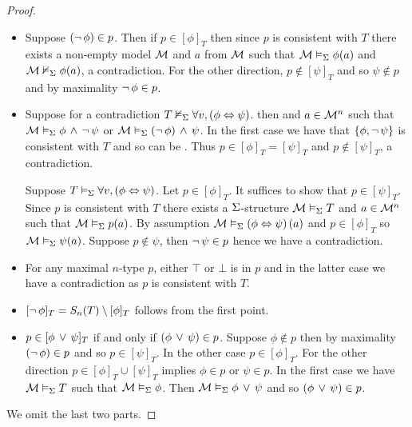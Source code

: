 \begin{proof}~
    \begin{itemize}
        \item Suppose $(\neg\, \phi) \in p$.
            Then if $p \in [\phi]_T$ then since $p$ is consistent with $T$
            there exists a non-empty model $\mathcal{M}$ and $a$ from 
            $\mathcal{M}$ such that
            $\mathcal{M} \vDash_{\Sigma} \phi(a)$ and $\mathcal{M} \nvDash_{\Sigma} \phi(a)$, 
            a contradiction.
            For the other direction, 
            $p \notin [\psi]_T$ and so $ \psi \notin p$ and
            by maximality $\neg\, \phi \in p$.
        \item \begin{forward}
            Suppose for a contradiction
            $T \nvDash_{\Sigma} \forall v, \left(\phi \Leftrightarrow \psi\right)$.
            then  and $a \in {\mathcal{M}}^n$ such that 
            $\mathcal{M} \vDash_{\Sigma} \phi \, \land \, \neg\, \psi$ or 
            $\mathcal{M} \vDash_{\Sigma} (\neg\, \phi) \, \land \, \psi$.
            In the first case we have that $\left\{\phi, \neg\, \psi\right\}$ 
            is consistent with $T$ and so can be 
            .
            Thus $p \in [\phi]_T = [\psi]_T$ and $p \notin [\psi]_T$, 
            a contradiction.
            \end{forward}
            \begin{backward}
                Suppose $T \vDash_{\Sigma} \forall v, \left(\phi \Leftrightarrow \psi\right)$.
                Let $p \in [\phi]_T$.
                It suffices to show that $p \in [\psi]_T$.
                Since $p$ is consistent with $T$ there exists a $\Sigma$-structure
                $\mathcal{M} \vDash_{\Sigma} T$ and $a \in {\mathcal{M}}^n$ such that 
                $\mathcal{M} \vDash_{\Sigma} p(a)$.
                By assumption $\mathcal{M} \vDash_{\Sigma} \left(\phi \Leftrightarrow \psi\right)(a)$
                and $p \in [\phi]_T$ so 
                $\mathcal{M} \vDash_{\Sigma} \psi(a)$.
                Suppose $p \notin \psi$, then $\neg\, \psi \in p$ hence 
                we have a contradiction.
            \end{backward}
        \item For any maximal $n$-type $p$,
            either $\top$ or $\bot$ is in $p$ and in the latter case we have a 
            contradiction as $p$ is consistent with $T$.
        \item $[\neg\, \phi]_T = S_n(T) \setminus [\phi]_T$ follows from the 
            first point.
        \item $p \in [\phi \, \lor \, \psi]_T$ if and only if 
            $(\phi \, \lor \, \psi) \in p$. 
            Suppose $\phi \notin p$ then by maximality 
            $(\neg\, \phi) \in p$ and so $p \in [\psi]_T$. 
            In the other case $p \in [\phi]_T$.
            For the other direction $p \in [\phi]_T \cup [\psi]_T$
            implies $\phi \in p$ or $\psi \in p$.
            In the first case we have $\mathcal{M} \vDash_{\Sigma} T$ such that 
            $\mathcal{M} \vDash_{\Sigma} \phi$.
            Then $\mathcal{M} \vDash_{\Sigma} \phi \, \lor \, \psi$ and so $(\phi \, \lor \, \psi) \in p$.
    \end{itemize}
    We omit the last two parts.
\end{proof}

